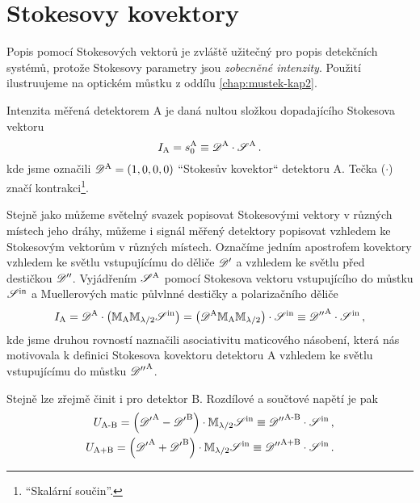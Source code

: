 \section{Stokesovy kovektory}
\label{app:kovektory}


Popis pomocí Stokesových vektorů je zvláště užitečný pro popis detekčních systémů, protože Stokesovy parametry jsou \emph{zobecněné intenzity}.
Použití ilustruujeme na optickém můstku z oddílu \ref{chap:mustek-kap2}.

Intenzita měřená detektorem A je daná nultou složkou dopadajícího Stokesova vektoru
\begin{equation}
    I_\textrm{A}=s_0^\textrm{A} \equiv \mathscr{D}^\textrm{A} \cdot \mathscr{S}^\textrm{A} \,.
\end{equation}
kde jsme označili $\mathscr{D}^\textrm{A}=(1, 0, 0, 0)$ ``Stokesův kovektor`` detektoru A. 
Tečka ($\cdot$) značí kontrakci\footnote{``Skalární součin''.}.

Stejně jako můžeme světelný svazek popisovat Stokesovými vektory v různých místech jeho dráhy, můžeme i signál měřený detektory popisovat vzhledem ke Stokesovým vektorům v různých místech.
Označíme jedním apostrofem kovektory vzhledem ke světlu vstupujícímu do děliče $\mathscr{D}'$ a vzhledem ke světlu před destičkou $\mathscr{D}''$.
Vyjádřením $\mathscr{S}^\textrm{A}$ pomocí Stokesova vektoru vstupujícího do můstku $\mathscr{S}^\textrm{in}$ a Muellerových matic půlvlnné destičky a polarizačního děliče 
\begin{equation}
    I_\textrm{A}= \mathscr{D}^\textrm{A} \cdot \left( \mathbb{M}_\textrm{A} \mathbb{M}_{\lambda/2} \mathscr{S}^\textrm{in} \right) = \left( \mathscr{D}^\textrm{A} \mathbb{M}_\textrm{A} \mathbb{M}_{\lambda/2}\right) \cdot \mathscr{S}^\textrm{in} \equiv {\mathscr{D}''}^\textrm{A} \cdot \mathscr{S}^\textrm{in}  \,,
\end{equation}
kde jsme druhou rovností naznačili asociativitu maticového násobení, která nás motivovala k definici Stokesova kovektoru detektoru A vzhledem ke světlu vstupujícímu do můstku ${\mathscr{D}''}^\textrm{A}$.

Stejně lze zřejmě činit i pro detektor B.
Rozdílové a součtové napětí je pak
\begin{align}
\label{eqn:af}
U_\textrm{A-B} = \left( {\mathscr{D}'}^\textrm{A}-{\mathscr{D}'}^\textrm{B}\right) \cdot \mathbb{M}_{\lambda/2} \mathscr{S}^\textrm{in} \equiv {\mathscr{D}''}^\textrm{A-B}\cdot \mathscr{S}^\textrm{in} \,, \\
U_\textrm{A+B} = \left({\mathscr{D}'}^\textrm{A}+{\mathscr{D}'}^\textrm{B}\right) \cdot \mathbb{M}_{\lambda/2}\mathscr{S}^\textrm{in} \equiv {\mathscr{D}''}^\textrm{A+B}\cdot \mathscr{S}^\textrm{in} \,.
\end{align}

